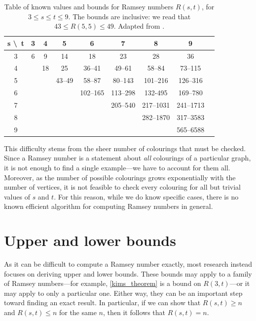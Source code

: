 \documentclass{article}
\begin{document}
\begin{table}
    \centering
    \begin{tabular}{ccccccccc}
        \toprule
        s \textbackslash\ t & 3 & 4 & 5 & 6 & 7 & 8 & 9 \\
        \midrule
        3 & 6 & 9 & 14 & 18 & 23 & 28 & 36 \\
        4 & & 18 & 25 & 36--41 & 49--61 & 58--84 & 73--115 \\
        5 & & & 43--49 & 58--87 & 80--143 & 101--216 & 126--316 \\
        6 & & & & 102--165 & 113--298 & 132-495 & 169--780 \\
        7 & & & & & 205--540 & 217--1031 & 241--1713 \\
        8 & & & & & & 282--1870 & 317--3583 \\
        9 & & & & & & & 565--6588 \\
        \bottomrule
    \end{tabular}
    \caption{Table of known values and bounds for Ramsey numbers $R(s,t)$, for $3 \leq s \leq t \leq 9$. The bounds are inclusive: we read that $43 \leq R(5,5) \leq 49$. Adapted from \cite{radziszowski1994small}.}
\end{table}

This difficulty stems from the sheer number of colourings that must be checked. Since a Ramsey number is a statement about \emph{all} colourings of a particular graph, it is not enough to find a single example---we have to account for them all. Moreover, as the number of possible colourings grows exponentially with the number of vertices, it is not feasible to check every colouring for all but trivial values of $s$ and $t$. For this reason, while we do know specific cases, there is no known efficient algorithm for computing Ramsey numbers in general.

\section{Upper and lower bounds}

As it can be difficult to compute a Ramsey number exactly, most research instead focuses on deriving upper and lower bounds. These bounds may apply to a family of Ramsey numbers---for example, \cref{kims_theorem} is a bound on $R(3,t)$---or it may apply to only a particular one. Either way, they can be an important step toward finding an exact result. In particular, if we can show that $R(s,t) \geq n$ and $R(s,t) \leq n$ for the same $n$, then it follows that $R(s,t) = n$.
\end{document}
